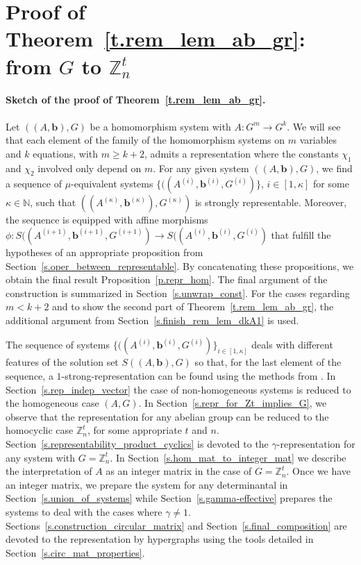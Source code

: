 \documentclass[10pt]{article}
\newcommand{\Z}{\mathbb Z}
\begin{document}
\section{Proof of Theorem~\ref{t.rem_lem_ab_gr}: from $G$ to $\Z_n^t$} \label{s.proof_rl-lsg-1}

\paragraph{Sketch of the proof of Theorem~\ref{t.rem_lem_ab_gr}.}

Let $((A,\mathbf{b}),G)$ be a homomorphism system with $A:G^m\to G^k$.
We will see that each element of the family of the homomorphism systems on $m$ variables and $k$ equations, with $m\geq k+2$, admits a representation where the constants $\chi_1$ and $\chi_2$ involved only depend on $m$.
For any given system $((A,\mathbf{b}),G)$,
 we find a sequence of $\mu$-equivalent systems $\{((A^{(i)},\mathbf{b}^{(i)},G^{(i)})\}$, $i\in[1,\kappa]$ for some $\kappa\in \mathbb{N}$, such that $((A^{(\kappa)},\mathbf{b}^{(\kappa)}),G^{(\kappa)})$ is strongly representable. Moreover, the sequence is equipped with affine morphisms $\phi:S((A^{(i+1)},\mathbf{b}^{(i+1)},G^{(i+1)})\to S((A^{(i)},\mathbf{b}^{(i)},G^{(i)})$ that fulfill the hypotheses of
an appropriate proposition from Section~\ref{s.oper_between_representable}. By concatenating these propositions, we obtain the final result Proposition~\ref{p.repr_hom}. The final argument of the construction is summarized in Section~\ref{s.unwrap_const}. For the cases regarding  $m< k+2$ and to show the second part of Theorem~\ref{t.rem_lem_ab_gr}, the additional argument from Section~\ref{s.finish_rem_lem_dkA1} is used.

The sequence of systems $\{((A^{(i)},\mathbf{b}^{(i)},G^{(i)})\}_{i\in[1,\kappa]}$ deals with different features of the solution set $S((A,\mathbf{b}),G)$ so that, for the last element of the sequence, a $1$-strong-representation can be found using the methods from \cite{ksv13}. In Section~\ref{s.rep_indep_vector} the case of non-homogeneous systems is reduced to the homogeneous case $(A,G)$. In Section~\ref{s.repr_for_Zt_implies_G}, we observe that the representation for any abelian group can be reduced to the homocyclic case $\Z_n^t$, for some appropriate $t$ and $n$.
Section~\ref{s.representability_product_cyclics} is
devoted to the $\gamma$-representation for any system with $G=\Z_n^t$. In Section~\ref{s.hom_mat_to_integer_mat} we describe the interpretation of $A$ as an integer matrix in the case of $G=\Z_n^t$. Once we have an integer matrix, we prepare the system for any determinantal in Section~\ref{s.union_of_systems} while Section~\ref{s.gamma-effective} prepares the systems to deal with the cases where $\gamma\neq 1$. Sections~\ref{s.construction_circular_matrix} and Section~\ref{s.final_composition} are devoted to the representation by hypergraphs using the tools detailed in Section~\ref{s.circ_mat_properties}.
\end{document}
